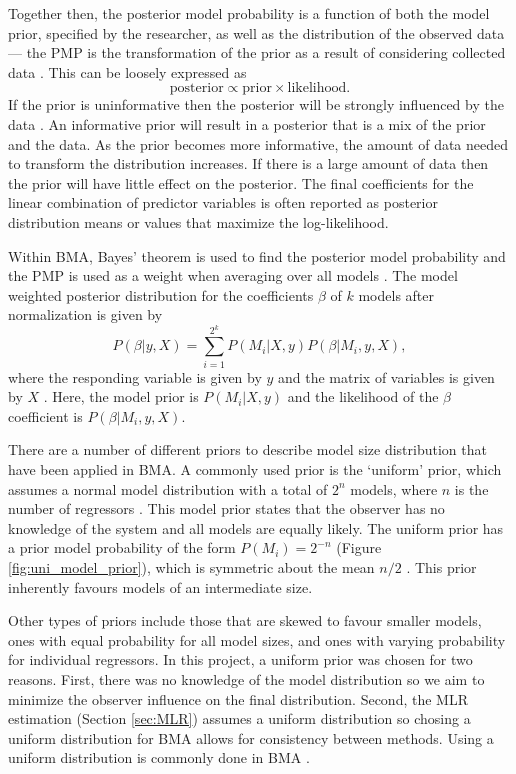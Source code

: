 \documentclass{sfuthesis}
\begin{document}
Together then, the posterior model probability is a function of both the model prior, specified by the researcher, as well as the distribution of the observed data --- the PMP is the transformation of the prior as a result of considering collected data \citep{Wasserman2000}. This can be loosely expressed as
\begin{equation}
\textrm{posterior} \propto \textrm{prior} \times \textrm{likelihood}.
\end{equation}
If the prior is uninformative then the posterior will be strongly influenced by the data \citep{Wasserman2000}. An informative prior will result in a posterior that is a mix of the prior and the data. As the prior becomes more informative, the amount of data needed to transform the distribution increases. If there is a large amount of data then the prior will have little effect on the posterior. The final coefficients for the linear combination of predictor variables is often reported as posterior distribution means or values that maximize the log-likelihood. 

Within BMA, Bayes' theorem is used to find the posterior model probability and the PMP is used as a weight when averaging over all models \citep{Wasserman2000}. The model weighted posterior distribution for the coefficients $\beta$ of $k$ models after normalization is given by 
\begin{equation}
P(\beta| y,X) = \sum\limits_{i=1}^{2^k} P(M_i | X,y)P(\beta | M_i , y, X),
\end{equation}
where the responding variable is given by $y$ and the matrix of variables is given by $X$ \citep{Raftery1997}. Here, the model prior is $P(M_i | X,y)$ and the likelihood of the $\beta$ coefficient is $P(\beta | M_i , y, X)$.

There are a number of different priors to describe model size distribution that have been applied in BMA. A commonly used prior is the `uniform' prior, which assumes a normal model distribution with a total of $2^n$ models, where $n$ is the number of regressors \citep{Wasserman2000}.  This model prior states that the observer has no knowledge of the system and all models are equally likely. The uniform prior has a prior model probability of the form $P(M_i)=2^{-n}$ (Figure \ref{fig:uni_model_prior}), which is symmetric about the mean $n/2$ \citep{Zeugner2015}. This prior inherently favours models of an intermediate size. 

Other types of priors include those that are skewed to favour smaller models, ones with equal probability for all model sizes, and ones with varying probability for individual regressors. In this project, a uniform prior was chosen for two reasons. First, there was no knowledge of the model distribution so we aim to minimize the observer influence on the final distribution. Second, the MLR estimation (Section \ref{sec:MLR}) assumes a uniform distribution so chosing a uniform distribution for BMA allows for consistency between methods. Using a uniform distribution is commonly done in BMA \citep{Wasserman2000}.
\end{document}
